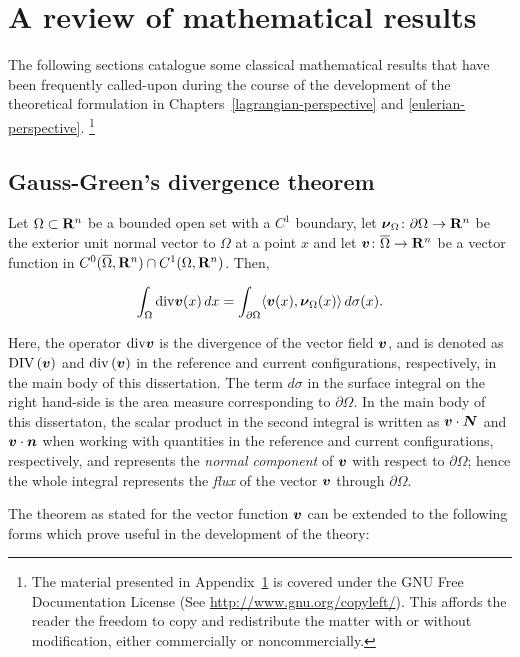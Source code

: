 \chapter{A review of mathematical results}
\label{additional-proofs}

The following sections catalogue some classical mathematical results
that have been frequently called-upon during the course of the
development of the theoretical formulation in
Chapters~\ref{lagrangian-perspective} and \ref{eulerian-perspective}.%
\footnote{The material presented in Appendix~\ref{additional-proofs}
  is covered under the GNU Free Documentation License (See
  \href{http://www.gnu.org/copyleft/}
       {http://www.gnu.org/copyleft/}). This affords the reader the
       freedom to copy and redistribute the matter with or without
       modification, either commercially or noncommercially.}

\section{Gauss-Green's divergence theorem}
\label{gauss-divergence}

Let $\Omega\subset \mathbf R^n$ be a bounded open set with a $C^1$ boundary,
let $\mbox{\boldmath$\nu$}_\Omega\colon \partial \Omega\to \mathbf R^n$ be the exterior unit
normal vector to $\Omega$ at a point $x$ and let $\mbox{\boldmath$ v$}\colon
\overline{\Omega}\to \mathbf R^n$ be a vector function in $C^0(\overline
\Omega,\mathbf R^n) \cap C^1(\Omega,\mathbf R^n)$. Then,

\[
\int_\Omega \mathrm{div} \mbox{\boldmath$ v$}(x)\, dx =\int_{\partial \Omega} \langle
\mbox{\boldmath$ v$}(x),\mbox{\boldmath$\nu$}_\Omega(x)\rangle \, d\sigma(x).
\]

Here, the operator $\mathrm{div} \mbox{\boldmath$ v$}$ is the divergence of the vector
field $\mbox{\boldmath$ v$}$, and is denoted as $\mathrm{DIV} \left(\mbox{\boldmath$ v$}\right)$ and
$\mathrm{div} \left(\mbox{\boldmath$ v$}\right)$ in the reference and current
configurations, respectively, in the main body of this
dissertation. The term $d\sigma$ in the surface integral on the right
hand-side is the area measure corresponding to $\partial \Omega$. In
the main body of this dissertaton, the scalar product in the second
integral is written as $\mbox{\boldmath$ v$} \cdot \mbox{\boldmath$ N$}$ and $\mbox{\boldmath$ v$} \cdot \mbox{\boldmath$ n$}$ when
working with quantities in the reference and current configurations,
respectively, and represents the \emph{normal component} of $\mbox{\boldmath$ v$}$ with
respect to $\partial \Omega$; hence the whole integral represents the
\emph{flux} of the vector $\mbox{\boldmath$ v$}$ through $\partial \Omega$.

The theorem as stated for the vector function $\mbox{\boldmath$ v$}$ can be extended to
the following forms which prove useful in the development of the
theory:

